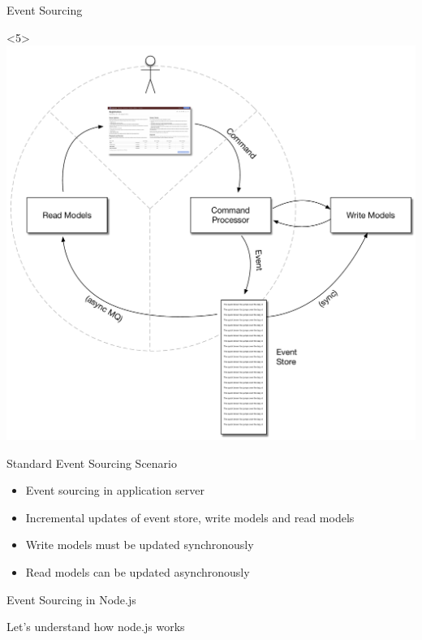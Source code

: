 \begin{frame}[fragile]{Event Sourcing}
\begin{onlyenv}<5>
\includegraphics[width=.7\textwidth]{../EventSourcing4.pdf}
\end{onlyenv}

\end{frame}

\begin{frame}[fragile]{Standard Event Sourcing Scenario}

\begin{itemize}
\item Event sourcing in application server
\item Incremental updates of event store, write models and read models
\item Write models must be updated synchronously
\item Read models can be updated asynchronously
\end{itemize}

\end{frame}

\begin{frame}[fragile]{Event Sourcing in Node.js}

Let's understand how node.js works

\end{frame}

